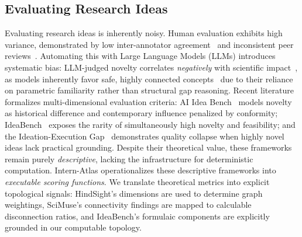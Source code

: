 \documentclass{opendatalab}
\begin{document}
\subsection{Evaluating Research Ideas}
Evaluating research ideas is inherently noisy. Human evaluation exhibits high variance, demonstrated by low inter-annotator agreement~\cite{si2024can} and inconsistent peer reviews~\cite{beygelzimer2023has}. Automating this with Large Language Models (LLMs) introduces systematic bias: LLM-judged novelty correlates \textit{negatively} with scientific impact~\cite{latimer2025hindsight}, as models inherently favor safe, highly connected concepts~\cite{gu2024generation} due to their reliance on parametric familiarity rather than structural gap reasoning. 
Recent literature formalizes multi-dimensional evaluation criteria: AI Idea Bench~\cite{qiu2025ai} models novelty as historical difference and contemporary influence penalized by conformity; IdeaBench~\cite{guo2025ideabench} exposes the rarity of simultaneously high novelty and feasibility; and the Ideation-Execution Gap~\cite{si2025ideation} demonstrates quality collapse when highly novel ideas lack practical grounding. Despite their theoretical value, these frameworks remain purely \textit{descriptive}, lacking the infrastructure for deterministic computation.
{Intern-Atlas} operationalizes these descriptive frameworks into \textit{executable scoring functions}. We translate theoretical metrics into explicit topological signals: HindSight's dimensions are used to determine graph weightings, SciMuse's connectivity findings are mapped to calculable disconnection ratios, and IdeaBench's formulaic components are explicitly grounded in our computable topology.
\end{document}
